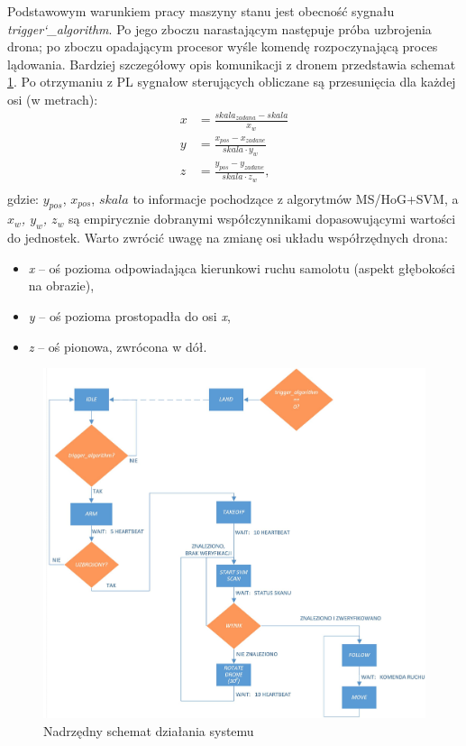 Podstawowym warunkiem pracy maszyny stanu jest obecność sygnału \textit{trigger\char`_algorithm}. 
Po jego zboczu narastającym następuje próba uzbrojenia drona; po zboczu opadającym procesor wyśle komendę rozpoczynającą proces lądowania. %
Bardziej szczegółowy opis komunikacji z dronem przedstawia schemat \ref{fig:PL_FSM_sch}.
Po otrzymaniu z PL sygnałow sterujących obliczane są przesunięcia dla każdej osi (w metrach):
\begin{equation}
\left.\begin{aligned}
x&= \frac{skala_{zadana}-skala}{x_w}\\
y&= \frac{x_{pos}-x_{zadane}}{skala\cdot y_w}\\
z&= \frac{y_{pos}-y_{zadane}}{skala\cdot z_w},\\
\end{aligned}\right.
\end{equation}
gdzie: $y_{pos}$, $x_{pos}$, $skala$ to informacje pochodzące z algorytmów MS/HoG+SVM, a \textit{$x_w$, $y_w$, $z_w$} są empirycznie dobranymi współczynnikami dopasowującymi wartości do jednostek. Warto zwrócić uwagę na zmianę osi układu współrzędnych drona:
\begin{itemize}
	\item \textit{x} -- oś pozioma odpowiadająca kierunkowi ruchu samolotu (aspekt głębokości na obrazie),
	\item \textit{y} -- oś pozioma prostopadła do osi \textit{x},
	\item \textit{z} -- oś pionowa, zwrócona w dół.
\end{itemize}

\begin{figure}[h]
\centering
\includegraphics[width=16cm]{5_PS_FSM.jpg}
\caption{Nadrzędny schemat działania systemu}
\label{fig:PL_FSM_sch}
\end{figure}


